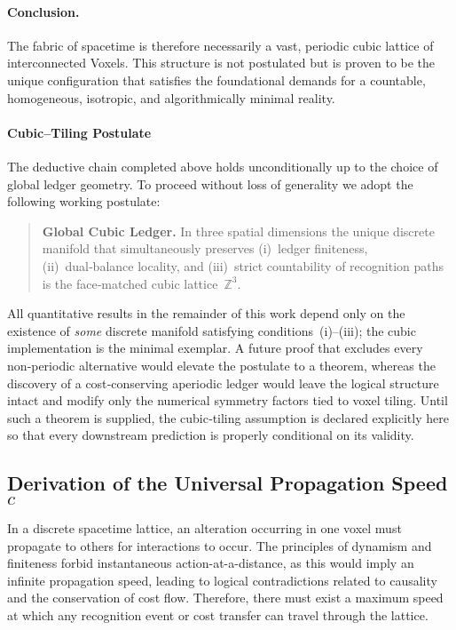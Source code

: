 \paragraph{Conclusion.}
The fabric of spacetime is therefore necessarily a vast, periodic cubic lattice of interconnected Voxels. This structure is not postulated but is proven to be the unique configuration that satisfies the foundational demands for a countable, homogeneous, isotropic, and algorithmically minimal reality.

\paragraph{Cubic–Tiling Postulate\;}%
The deductive chain completed above holds unconditionally up to the
choice of global ledger geometry.  To proceed without loss of
generality we adopt the following working postulate:

\begin{quote}
\textbf{Global Cubic Ledger.}  In three spatial dimensions the unique
discrete manifold that simultaneously preserves
(i)~ledger finiteness, (ii)~dual‑balance locality, and
(iii)~strict countability of recognition paths
is the face‑matched cubic lattice $\,\mathbb Z^{3}$.
\end{quote}

All quantitative results in the remainder of this work depend only on
the existence of \emph{some} discrete manifold satisfying
conditions~(i)–(iii); the cubic implementation is the minimal exemplar.
A future proof that excludes every non‑periodic alternative would
elevate the postulate to a theorem, whereas the discovery of a
cost‑conserving aperiodic ledger would leave the logical structure
intact and modify only the numerical symmetry factors tied to voxel
tiling.  Until such a theorem is supplied, the cubic‑tiling assumption
is declared explicitly here so that every downstream prediction is
properly conditional on its validity.

\subsection{Derivation of the Universal Propagation Speed \texorpdfstring{$c$}{c}}
In a discrete spacetime lattice, an alteration occurring in one voxel must propagate to others for interactions to occur. The principles of dynamism and finiteness forbid instantaneous action-at-a-distance, as this would imply an infinite propagation speed, leading to logical contradictions related to causality and the conservation of cost flow. Therefore, there must exist a maximum speed at which any recognition event or cost transfer can travel through the lattice.

